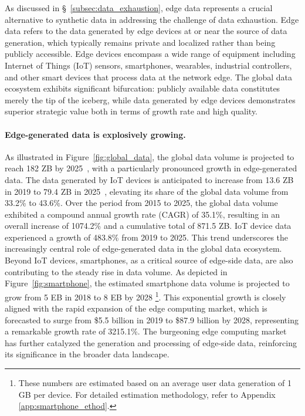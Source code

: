 As discussed in §~\ref{subsec:data_exhaustion}, edge data represents a crucial alternative to synthetic data in addressing the challenge of data exhaustion. Edge data refers to the data generated by edge devices at or near the source of data generation, which typically remains private and localized rather than being publicly accessible. Edge devices encompass a wide range of equipment including Internet of Things (IoT) sensors, smartphones, wearables, industrial controllers, and other smart devices that process data at the network edge. The global data ecosystem exhibits significant bifurcation: publicly available data constitutes merely the tip of the iceberg, while data generated by edge devices demonstrates superior strategic value both in terms of growth rate and high quality.

\paragraph{Edge-generated data is explosively growing.} 
As illustrated in Figure~\ref{fig:global_data}, the global data volume is projected to reach 182 ZB by 2025~\cite{statista_global_2023}, with a particularly pronounced growth in edge-generated data. The data generated by IoT devices is anticipated to increase from 13.6 ZB in 2019 to 79.4 ZB in 2025~\cite{statista_iot_2023}, elevating its share of the global data volume from 33.2\% to 43.6\%. Over the period from 2015 to 2025, the global data volume exhibited a compound annual growth rate (CAGR) of 35.1\%, resulting in an overall increase of 1074.2\% and a cumulative total of 871.5 ZB. IoT device data experienced a growth of 483.8\% from 2019 to 2025. This trend underscores the increasingly central role of edge-generated data in the global data ecosystem.
Beyond IoT devices, smartphones, as a critical source of edge-side data, are also contributing to the steady rise in data volume. As depicted in Figure~\ref{fig:smartphone}, the estimated smartphone data volume is projected to grow from 5 EB in 2018 to 8 EB by 2028
\footnote{These numbers are estimated based on an average user data generation of 1 GB per device. For detailed estimation methodology, refer to Appendix \ref{app:smartphone_ethod}.}. 
This exponential growth is closely aligned with the rapid expansion of the edge computing market, which is forecasted to surge from \$5.5 billion in 2019 to \$87.9 billion by 2028, representing a remarkable growth rate of 3215.1\%. The burgeoning edge computing market has further catalyzed the generation and processing of edge-side data, reinforcing its significance in the broader data landscape.
